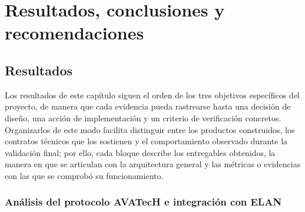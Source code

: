 
\section[RESULTADOS, CONCLUSIONES Y RECOMENDACIONES]{Resultados, conclusiones y recomendaciones}

\subsection{Resultados}

Los resultados de este capítulo siguen el orden de los tres objetivos específicos del proyecto, de manera que cada evidencia pueda rastrearse hasta una decisión de diseño, una acción de implementación y un criterio de verificación concretos. Organizarlos de este modo facilita distinguir entre los productos construidos, los contratos técnicos que los sostienen y el comportamiento observado durante la validación final; por ello, cada bloque describe los entregables obtenidos, la manera en que se articulan con la arquitectura general y las métricas o evidencias con las que se comprobó su funcionamiento.

\subsubsection{Análisis del protocolo AVATecH e integración con ELAN}

